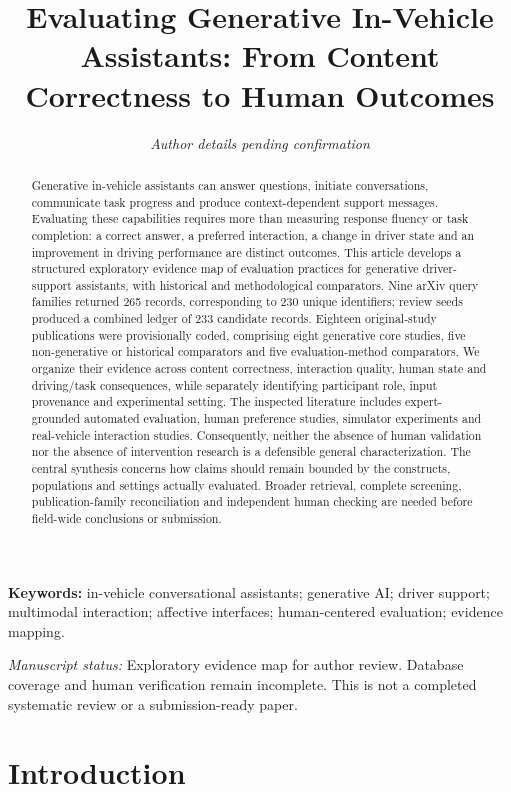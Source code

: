 \documentclass[11pt,a4paper]{article}
\title{Evaluating Generative In-Vehicle Assistants: From Content
Correctness to Human Outcomes}
\author{\textit{Author details pending confirmation}}
\date{}
\begin{document}
\maketitle
\begin{abstract}
Generative in-vehicle assistants can answer questions, initiate
conversations, communicate task progress and produce context-dependent
support messages. Evaluating these capabilities requires more than
measuring response fluency or task completion: a correct answer, a
preferred interaction, a change in driver state and an improvement in
driving performance are distinct outcomes. This article develops a
structured exploratory evidence map of evaluation practices for
generative driver-support assistants, with historical and methodological
comparators. Nine arXiv query families returned 265 records,
corresponding to 230 unique identifiers; review seeds produced a
combined ledger of 233 candidate records. Eighteen original-study
publications were provisionally coded, comprising eight generative core
studies, five non-generative or historical comparators and five
evaluation-method comparators. We organize their evidence across content
correctness, interaction quality, human state and driving/task
consequences, while separately identifying participant role, input
provenance and experimental setting. The inspected literature includes
expert-grounded automated evaluation, human preference studies,
simulator experiments and real-vehicle interaction studies.
Consequently, neither the absence of human validation nor the absence of
intervention research is a defensible general characterization. The
central synthesis concerns how claims should remain bounded by the
constructs, populations and settings actually evaluated. Broader
retrieval, complete screening, publication-family reconciliation and
independent human checking are needed before field-wide conclusions or
submission.
\end{abstract}
\noindent\textbf{Keywords:} in-vehicle conversational
assistants; generative AI; driver support; multimodal
interaction; affective interfaces; human-centered evaluation; evidence
mapping.
\par\medskip
\noindent\textit{Manuscript status:} Exploratory evidence map for author review. Database coverage and human verification remain incomplete. This is not a completed systematic review or a submission-ready paper.
\par\medskip
\section{Introduction}\label{introduction}
\end{document}
